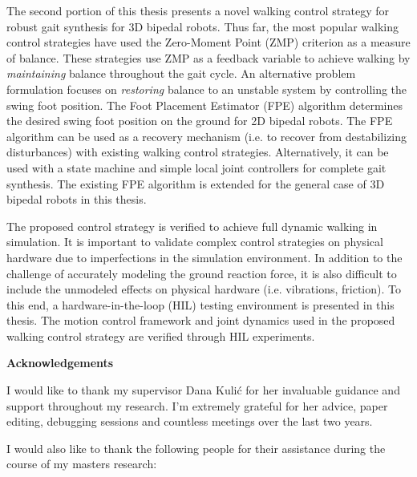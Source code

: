 The second portion of this thesis presents a novel walking control strategy for robust gait synthesis for 3D bipedal robots. Thus far, the most popular walking control strategies have used the Zero-Moment Point (ZMP) criterion as a measure of balance. These strategies use ZMP as a feedback variable to achieve walking by \emph{maintaining} balance throughout the gait cycle. An alternative problem formulation focuses on \emph{restoring} balance to an unstable system by controlling the swing foot position. The Foot Placement Estimator (FPE) algorithm determines the desired swing foot position on the ground for 2D bipedal robots. The FPE algorithm can be used as a recovery mechanism (i.e. to recover from destabilizing disturbances) with existing walking control strategies. Alternatively, it can be used with a state machine and simple local joint controllers for complete gait synthesis. The existing FPE algorithm is extended for the general case of 3D bipedal robots in this thesis. 

The proposed control strategy is verified to achieve full dynamic walking in simulation. It is important to validate complex control strategies on physical hardware due to imperfections in the simulation environment. In addition to the challenge of accurately modeling the ground reaction force, it is also difficult to include the unmodeled effects on physical hardware (i.e. vibrations, friction). To this end, a hardware-in-the-loop (HIL) testing environment is presented in this thesis. The motion control framework and joint dynamics used in the proposed walking control strategy are verified through HIL experiments.

\cleardoublepage


\begin{center}
    \textbf{Acknowledgements}
\end{center}

I would like to thank my supervisor Dana Kuli\'{c} for her invaluable guidance and support throughout my research. I'm extremely grateful for her advice, paper editing, debugging sessions and countless meetings over the last two years.  

I would also like to thank the following people for their assistance during the course of my masters research: 


